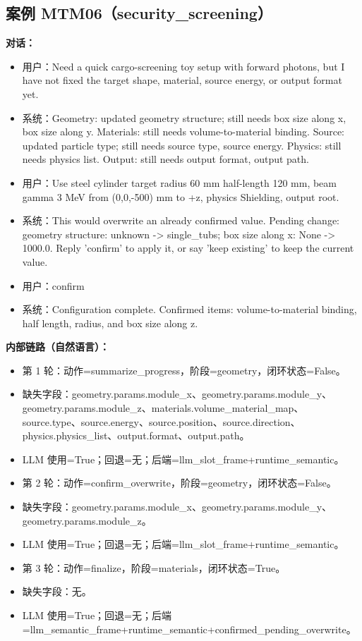 \documentclass[11pt]{ctexart}
\begin{document}
\subsection{案例 MTM06（security\_screening）}
\textbf{对话：}
\begin{itemize}
\item 用户：Need a quick cargo-screening toy setup with forward photons, but I have not fixed the target shape, material, source energy, or output format yet.
\item 系统：Geometry: updated geometry structure; still needs box size along x, box size along y. Materials: still needs volume-to-material binding. Source: updated particle type; still needs source type, source energy. Physics: still needs physics list. Output: still needs output format, output path.
\item 用户：Use steel cylinder target radius 60 mm half-length 120 mm, beam gamma 3 MeV from (0,0,-500) mm to +z, physics Shielding, output root.
\item 系统：This would overwrite an already confirmed value. Pending change: geometry structure: unknown -> single\_tubs; box size along x: None -> 1000.0. Reply 'confirm' to apply it, or say 'keep existing' to keep the current value.
\item 用户：confirm
\item 系统：Configuration complete. Confirmed items: volume-to-material binding, half length, radius, and box size along z.
\end{itemize}
\textbf{内部链路（自然语言）：}
\begin{itemize}
\item 第 1 轮：动作=summarize\_progress，阶段=geometry，闭环状态=False。
\item 缺失字段：geometry.params.module\_x、geometry.params.module\_y、geometry.params.module\_z、materials.volume\_material\_map、source.type、source.energy、source.position、source.direction、physics.physics\_list、output.format、output.path。
\item LLM 使用=True；回退=无；后端=llm\_slot\_frame+runtime\_semantic。
\item 第 2 轮：动作=confirm\_overwrite，阶段=geometry，闭环状态=False。
\item 缺失字段：geometry.params.module\_x、geometry.params.module\_y、geometry.params.module\_z。
\item LLM 使用=True；回退=无；后端=llm\_slot\_frame+runtime\_semantic。
\item 第 3 轮：动作=finalize，阶段=materials，闭环状态=True。
\item 缺失字段：无。
\item LLM 使用=True；回退=无；后端=llm\_semantic\_frame+runtime\_semantic+confirmed\_pending\_overwrite。
\end{itemize}
\end{document}
